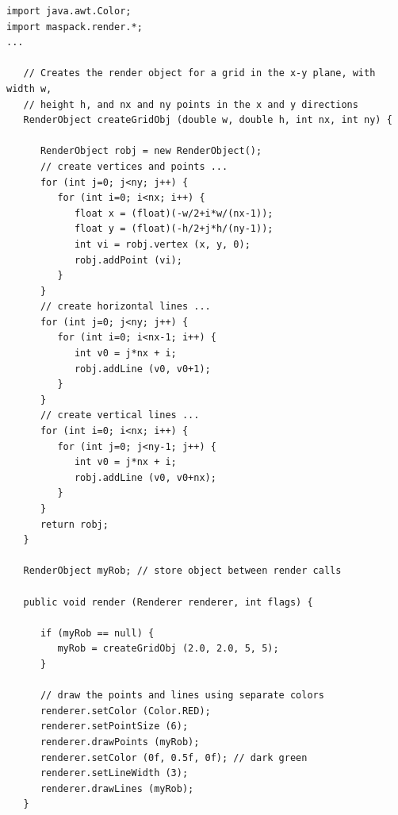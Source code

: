 \begin{lstlisting}[caption={Building and drawing render object for a grid.},
label=gridRegular:lst]
import java.awt.Color;
import maspack.render.*;
...

   // Creates the render object for a grid in the x-y plane, with width w, 
   // height h, and nx and ny points in the x and y directions
   RenderObject createGridObj (double w, double h, int nx, int ny) {
      
      RenderObject robj = new RenderObject();
      // create vertices and points ...
      for (int j=0; j<ny; j++) {
         for (int i=0; i<nx; i++) {
            float x = (float)(-w/2+i*w/(nx-1));
            float y = (float)(-h/2+j*h/(ny-1));
            int vi = robj.vertex (x, y, 0);
            robj.addPoint (vi);
         }
      }
      // create horizontal lines ...
      for (int j=0; j<ny; j++) {
         for (int i=0; i<nx-1; i++) {
            int v0 = j*nx + i;
            robj.addLine (v0, v0+1);
         }
      }
      // create vertical lines ...
      for (int i=0; i<nx; i++) {
         for (int j=0; j<ny-1; j++) {
            int v0 = j*nx + i;
            robj.addLine (v0, v0+nx);
         }
      }
      return robj;         
   }
   
   RenderObject myRob; // store object between render calls
   
   public void render (Renderer renderer, int flags) {
   
      if (myRob == null) {
         myRob = createGridObj (2.0, 2.0, 5, 5);
      }
   
      // draw the points and lines using separate colors
      renderer.setColor (Color.RED);
      renderer.setPointSize (6);
      renderer.drawPoints (myRob);
      renderer.setColor (0f, 0.5f, 0f); // dark green
      renderer.setLineWidth (3);
      renderer.drawLines (myRob);
   }
\end{lstlisting}
%
